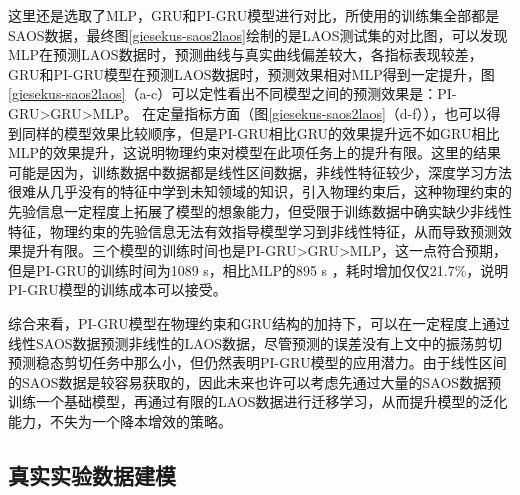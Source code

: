 这里还是选取了MLP，GRU和PI-GRU模型进行对比，所使用的训练集全部都是SAOS数据，最终图\ref{giesekus-saos2laos}绘制的是LAOS测试集的对比图，可以发现MLP在预测LAOS数据时，预测曲线与真实曲线偏差较大，各指标表现较差，GRU和PI-GRU模型在预测LAOS数据时，预测效果相对MLP得到一定提升，图\ref{giesekus-saos2laos}（a-c）可以定性看出不同模型之间的预测效果是：PI-GRU>GRU>MLP。
在定量指标方面（图\ref{giesekus-saos2laos}（d-f）），也可以得到同样的模型效果比较顺序，但是PI-GRU相比GRU的效果提升远不如GRU相比MLP的效果提升，这说明物理约束对模型在此项任务上的提升有限。这里的结果可能是因为，训练数据中数据都是线性区间数据，非线性特征较少，深度学习方法很难从几乎没有的特征中学到未知领域的知识，引入物理约束后，这种物理约束的先验信息一定程度上拓展了模型的想象能力，但受限于训练数据中确实缺少非线性特征，物理约束的先验信息无法有效指导模型学习到非线性特征，从而导致预测效果提升有限。三个模型的训练时间也是PI-GRU>GRU>MLP，这一点符合预期，但是PI-GRU的训练时间为1089 s，相比MLP的895 s ，耗时增加仅仅21.7\%，说明PI-GRU模型的训练成本可以接受。

综合来看，PI-GRU模型在物理约束和GRU结构的加持下，可以在一定程度上通过线性SAOS数据预测非线性的LAOS数据，尽管预测的误差没有上文中的振荡剪切预测稳态剪切任务中那么小，但仍然表明PI-GRU模型的应用潜力。由于线性区间的SAOS数据是较容易获取的，因此未来也许可以考虑先通过大量的SAOS数据预训练一个基础模型，再通过有限的LAOS数据进行迁移学习，从而提升模型的泛化能力，不失为一个降本增效的策略。

\subsection{真实实验数据建模}

